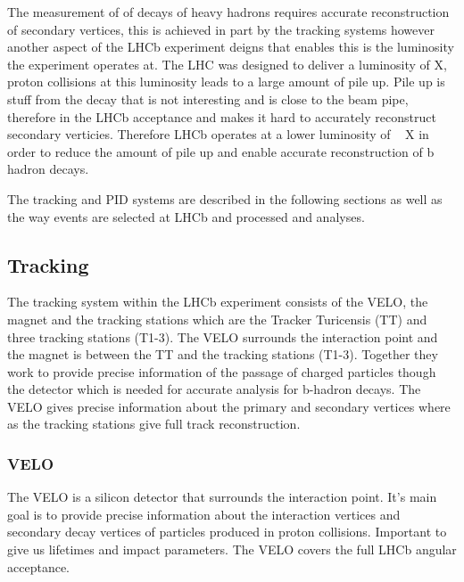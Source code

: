 The measurement of of decays of heavy hadrons requires accurate reconstruction of secondary vertices, this is achieved in part by the tracking systems however another aspect of the LHCb experiment deigns that enables this is the luminosity the experiment operates at. The LHC was designed to deliver a luminosity of X, proton collisions at this luminosity leads to a large amount of pile up. Pile up is stuff from the decay that is not interesting and is close to the beam pipe, therefore in the LHCb acceptance and makes it hard to accurately reconstruct secondary verticies. Therefore LHCb operates at a lower luminosity of ~ X in order to reduce the amount of pile up and enable accurate reconstruction of b hadron decays. 

The tracking and PID systems are described in the following sections as well as the way events are selected at LHCb and processed and analyses. 



\subsection{Tracking}
\label{Tracking}

The tracking system within the LHCb experiment consists of the VELO, the magnet and the tracking stations which are the Tracker Turicensis (TT) and three tracking stations (T1-3). The VELO surrounds the interaction point and the magnet is between the TT and the tracking stations (T1-3). Together they work to provide precise information of the passage of charged particles though the detector which is needed for accurate analysis for b-hadron decays. The VELO gives precise information about the primary and secondary vertices where as the tracking stations give full track reconstruction. 

\subsubsection{VELO}
\label{VELO}
The VELO is a silicon detector that surrounds the interaction point. It’s main goal is to provide precise information about the interaction vertices and secondary decay vertices of particles produced in proton collisions. Important to give us lifetimes and impact parameters. The VELO covers the full LHCb angular acceptance.

